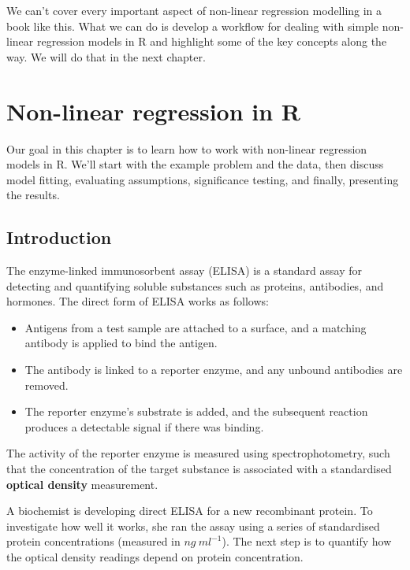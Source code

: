 \documentclass[
]{book}
\providecommand{\tightlist}{%
  \setlength{\itemsep}{0pt}\setlength{\parskip}{0pt}}
\begin{document}
We can't cover every important aspect of non-linear regression modelling in a book like this. What we can do is develop a workflow for dealing with simple non-linear regression models in R and highlight some of the key concepts along the way. We will do that in the next chapter.

\hypertarget{non-linear-regression-in-R}{%
\chapter{Non-linear regression in R}\label{non-linear-regression-in-R}}

Our goal in this chapter is to learn how to work with non-linear regression models in R. We'll start with the example problem and the data, then discuss model fitting, evaluating assumptions, significance testing, and finally, presenting the results.

\hypertarget{introduction-6}{%
\section{Introduction}\label{introduction-6}}

The enzyme-linked immunosorbent assay (ELISA) is a standard assay for detecting and quantifying soluble substances such as proteins, antibodies, and hormones. The direct form of ELISA works as follows:

\begin{itemize}
\tightlist
\item
  Antigens from a test sample are attached to a surface, and a matching antibody is applied to bind the antigen.
\item
  The antibody is linked to a reporter enzyme, and any unbound antibodies are removed.
\item
  The reporter enzyme's substrate is added, and the subsequent reaction produces a detectable signal if there was binding.
\end{itemize}

The activity of the reporter enzyme is measured using spectrophotometry, such that the concentration of the target substance is associated with a standardised \textbf{optical density} measurement.

A biochemist is developing direct ELISA for a new recombinant protein. To investigate how well it works, she ran the assay using a series of standardised protein concentrations (measured in \(ng\ ml^{-1}\)). The next step is to quantify how the optical density readings depend on protein concentration.
\end{document}

